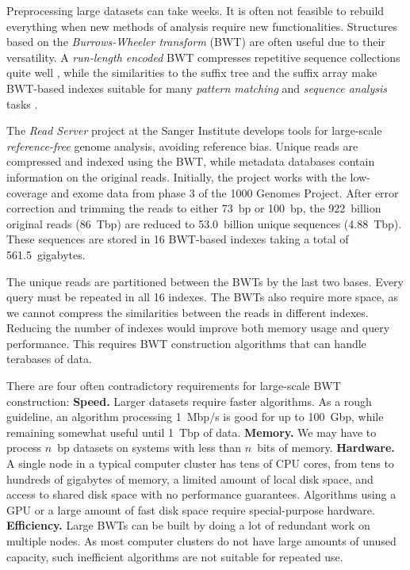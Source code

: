 \documentclass[smallabstract,smallcaptions]{dccpaper}
\newcommand{\BWT}{\textsf{BWT}}
\begin{document}
Preprocessing large datasets can take weeks. It is often not feasible to rebuild everything when new methods of analysis require new functionalities. Structures based on the \emph{Burrows-Wheeler transform} (\BWT) are often useful due to their versatility. A \emph{run-length encoded} \BWT{} compresses repetitive sequence collections quite well \cite{Maekinen2010}, while the similarities to the suffix tree and the suffix array make \BWT-based indexes suitable for many \emph{pattern matching} and \emph{sequence analysis} tasks \cite{Ohlebusch2013,Maekinen2015}.

The \emph{Read Server} project at the Sanger Institute develops tools for large-scale \emph{reference-free} genome analysis, avoiding reference bias. Unique reads are compressed and indexed using the \BWT, while metadata databases contain information on the original reads. Initially, the project works with
the low-coverage and exome data from phase 3 of the 1000 Genomes Project.
After error correction and trimming the reads to either 73~bp or 100~bp, the 922~billion original reads (86~Tbp) are reduced to 53.0~billion unique sequences (4.88~Tbp). These sequences are stored in 16 \BWT-based indexes \cite{Ferragina2005a} taking a total of 561.5~gigabytes.

The unique reads are partitioned between the \BWT{}s by the last two bases. Every query must be repeated in all 16 indexes. The \BWT{}s also require more space, as we cannot compress the similarities between the reads in different indexes. Reducing the number of indexes would improve both memory usage and query performance. This requires \BWT{} construction algorithms that can handle terabases of data.

There are four often contradictory requirements for large-scale \BWT{} construction:
\textbf{Speed.} Larger datasets require faster algorithms. As a rough guideline, an algorithm processing 1~Mbp/s is good for up to 100~Gbp, while remaining somewhat useful until 1~Tbp of data.
\textbf{Memory.} We may have to process $n$~bp datasets on systems with less than $n$~bits of memory.
\textbf{Hardware.} A single node in a typical computer cluster has tens of CPU cores, from tens to hundreds of gigabytes of memory, a limited amount of local disk space, and access to shared disk space with no performance guarantees. Algorithms using a GPU or a large amount of fast disk space require special-purpose hardware.
\textbf{Efficiency.} Large \BWT{}s can be built by doing a lot of redundant work on multiple nodes. As most computer clusters do not have large amounts of unused capacity, such inefficient algorithms are not suitable for repeated use.
\end{document}
